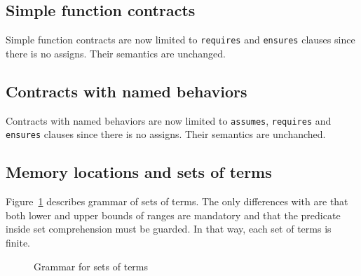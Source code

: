 
\subsection{Simple function contracts}
\label{sec:simplecontracts}


Simple function contracts are now limited to \lstinline|requires| and
\lstinline|ensures| clauses since there is no assigns. Their semantics are
unchanged.


\subsection{Contracts with named behaviors}
\label{subsec:behaviors}


Contracts with named behaviors are now limited to \lstinline|assumes|,
\lstinline|requires| and \lstinline|ensures| clauses since there is no
assigns. Their semantics are unchanched.


\subsection{Memory locations and sets of terms}
\label{sec:locations}


Figure~\ref{fig:gram:locations} describes grammar of sets of terms. The only
differences with \acsl are that both lower and upper bounds of ranges are
mandatory and that the predicate inside set comprehension must be guarded. In
that way, each set of terms is finite.
\begin{figure}[htbp]
  \caption{Grammar for sets of terms}
\label{fig:gram:locations}
\end{figure}


